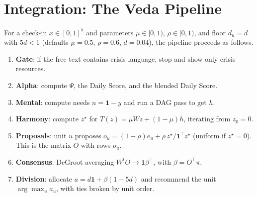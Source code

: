 \documentclass[11pt]{article}
\theoremstyle{definition}
\theoremstyle{remark}
\newcommand{\one}{\mathbf{1}}
\begin{document}
\section{Integration: The Veda Pipeline}\label{sec:integration}
For a check-in $x\in[0,1]^5$ and parameters $\mu\in[0,1)$, $\rho\in[0,1)$, and floor $d_u=d$ with $5d<1$ (defaults $\mu=0.5$, $\rho=0.6$, $d=0.04$), the pipeline proceeds as follows.
\begin{enumerate}
\item \textbf{Gate}: if the free text contains crisis language, stop and show only crisis resources.
\item \textbf{Alpha}: compute $\Psi$, the Daily Score, and the blended Daily Score.
\item \textbf{Mental}: compute needs $n=\one-y$ and run a DAG pass to get $h$.
\item \textbf{Harmony}: compute $z^\star$ for $T(z)=\mu Wz+(1-\mu)h$, iterating from $z_0=0$.
\item \textbf{Proposals}: unit $u$ proposes $o_u=(1-\rho)e_u+\rho\,z^\star/\one^\top z^\star$ (uniform if $z^\star=0$). This is the matrix $O$ with rows $o_u$.
\item \textbf{Consensus}: DeGroot averaging $W^tO\to\one\beta^\top$, with $\beta=O^\top\pi$.
\item \textbf{Division}: allocate $a=d\one+\beta(1-5d)$ and recommend the unit $\arg\max_ua_u$, with ties broken by unit order.
\end{enumerate}
\end{document}
